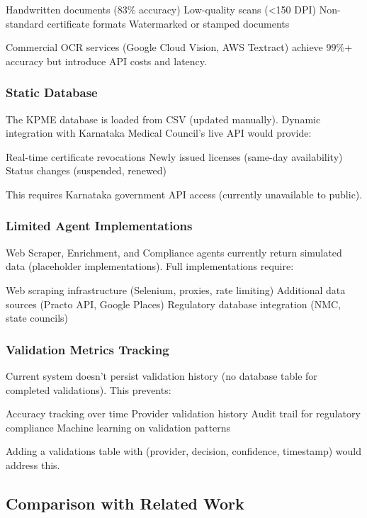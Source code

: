 \documentclass[conference]{IEEEtran}
\begin{document}
Handwritten documents (83\% accuracy)
Low-quality scans (<150 DPI)
Non-standard certificate formats
Watermarked or stamped documents

Commercial OCR services (Google Cloud Vision, AWS Textract) achieve 99\%+ accuracy but introduce API costs and latency.

\subsubsection{Static Database}

The KPME database is loaded from CSV (updated manually). Dynamic integration with Karnataka Medical Council's live API would provide:

Real-time certificate revocations
Newly issued licenses (same-day availability)
Status changes (suspended, renewed)

This requires Karnataka government API access (currently unavailable to public).

\subsubsection{Limited Agent Implementations}

Web Scraper, Enrichment, and Compliance agents currently return simulated data (placeholder implementations). Full implementations require:

Web scraping infrastructure (Selenium, proxies, rate limiting)
Additional data sources (Practo API, Google Places)
Regulatory database integration (NMC, state councils)

\subsubsection{Validation Metrics Tracking}

Current system doesn't persist validation history (no database table for completed validations). This prevents:

Accuracy tracking over time
Provider validation history
Audit trail for regulatory compliance
Machine learning on validation patterns

Adding a validations table with (provider, decision, confidence, timestamp) would address this.

\subsection{Comparison with Related Work}
\end{document}
